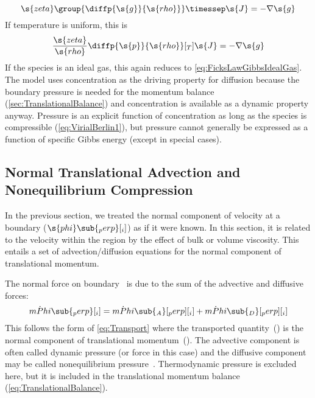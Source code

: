 \begin{equation}
  \s{zeta}\group{\diffp{\s{g}}{\s{rho}}}\timessep\s{J} = -\nabla\s{g}
\end{equation}
If temperature is uniform, this is
\begin{equation}
  \frac{\s{zeta}}{\s{rho}}\diffp{\s{p}}{\s{rho}}[_T]\s{J} = -\nabla\s{g}
\end{equation}
If the species is an ideal gas, this again reduces to \autoref{eq:FicksLawGibbsIdealGas}.  The model uses concentration as the driving property for diffusion because the boundary pressure is needed for the momentum balance (\autoref{sec:TranslationalBalance}) and concentration is available as a dynamic property anyway.  Pressure is an explicit function of concentration as long as the species is compressible (\autoref{eq:VirialBerlin1}), but pressure cannot generally be expressed as a function of specific Gibbs energy (except in special cases).



\subsection{Normal Translational Advection and Nonequilibrium Compression}
\label{sec:NormalTransport}

In the previous section, we treated the normal component of velocity at a boundary ($\s{phi}\sub{_perp}[_i]$) as if it were known.  In this section, it is related to the velocity within the region by the effect of bulk or volume viscosity.  This entails a set of advection\slash{}diffusion equations for the normal component of translational momentum.

The normal force on boundary~ is due to the sum of the advective and diffusive forces:
\begin{equation}
  \label{eq:NormalForce}
  \dot{mPhi}\sub{_perp}[_i] = \dot{mPhi}\sub{_A}[_perp][_i] + \dot{mPhi}\sub{_D}[_perp][_i]
\end{equation}
This follows the form of \autoref{eq:Transport} where the transported quantity~() is the normal component of translational momentum~().  The advective component is often called dynamic pressure (or force in this case) and the diffusive component may be called nonequilibrium pressure~\cite{Meier2005}.  Thermodynamic pressure is excluded here, but it is included in the translational momentum balance (\autoref{eq:TranslationalBalance}).


